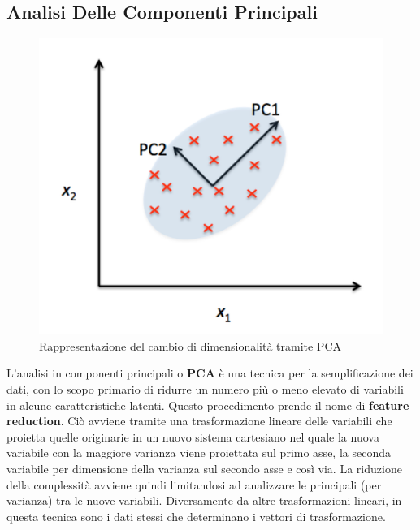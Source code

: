 \subsection{Analisi Delle Componenti Principali}
\begin{figure}[]
	\centering
	\includegraphics[width=1\textwidth]{images/pca.png}
	\caption{Rappresentazione del cambio di dimensionalità tramite PCA}
\end{figure}
L'analisi in componenti principali o \textbf{PCA} è una tecnica per la semplificazione dei dati, con lo scopo primario di ridurre un numero più o meno elevato di variabili in alcune caratteristiche latenti. Questo procedimento prende il nome di \textbf{feature reduction}. Ciò avviene tramite una trasformazione lineare delle variabili che proietta quelle originarie in un nuovo sistema cartesiano nel quale la nuova variabile con la maggiore varianza viene proiettata sul primo asse, la seconda variabile per dimensione della varianza sul secondo asse e così via. La riduzione della complessità avviene quindi limitandosi ad analizzare le principali (per varianza) tra le nuove variabili. Diversamente da altre trasformazioni lineari, in questa tecnica sono i dati stessi che determinano i vettori di trasformazione.\\
